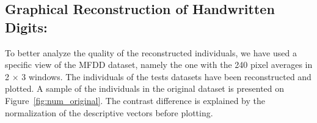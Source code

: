 \subsection{Graphical Reconstruction of Handwritten Digits:}
\label{sec:num}

To better analyze the quality of the reconstructed individuals, we have used a specific view of the MFDD dataset, namely the one with the 240 pixel averages in 2 $\times$ 3 windows. The individuals of the tests datasets have been reconstructed and plotted. A sample of the individuals in the original dataset is presented on Figure~\ref{fig:num_original}. The contrast difference is explained by the normalization of the descriptive vectors before plotting.

\begin{figure}[H]
    \centering

\end{figure}
